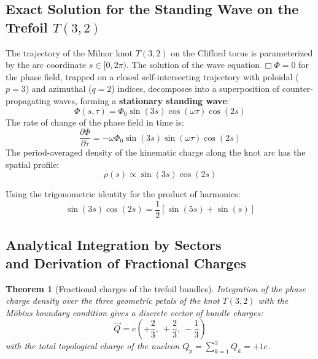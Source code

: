 \documentclass[12pt,a4paper]{article}
\newtheorem{theorem}{Theorem}
\begin{document}
		\subsection{Exact Solution for the Standing Wave on the Trefoil $T(3,2)$}
		The trajectory of the Milnor knot $T(3,2)$ on the Clifford torus is parameterized by the arc coordinate $s \in [0, 2\pi)$. 
		The solution of the wave equation $\Box \Phi = 0$ for the phase field, trapped on a closed self-intersecting trajectory with poloidal ($p=3$) and azimuthal ($q=2$) indices, decomposes into a superposition of counter-propagating waves, forming a \textbf{stationary standing wave}:
		\begin{equation}
			\Phi(s, \tau) = \Phi_0 \sin(3s) \cos(\omega \tau) \cos(2s)
		\end{equation}
		The rate of change of the phase field in time is:
		\begin{equation}
			\frac{\partial \Phi}{\partial \tau} = -\omega \Phi_0 \sin(3s) \sin(\omega \tau) \cos(2s)
		\end{equation}
		The period-averaged density of the kinematic charge along the knot arc has the spatial profile:
		\begin{equation}
			\rho(s) \propto \sin(3s) \cos(2s)
		\end{equation}
		
		Using the trigonometric identity for the product of harmonics:
		\begin{equation}
			\sin(3s) \cos(2s) = \frac{1}{2} \left[ \sin(5s) + \sin(s) \right]
		\end{equation}
		
		\subsection{Analytical Integration by Sectors\\ and Derivation of Fractional Charges}
		\begin{theorem}[Fractional charges of the trefoil bundles]
			Integration of the phase charge density over the three geometric petals of the knot $T(3,2)$ with the Möbius boundary condition gives a discrete vector of bundle charges:
			\begin{equation}
				\vec{Q} = e \left( +\frac{2}{3}, \ +\frac{2}{3}, \ -\frac{1}{3} \right)
			\end{equation}
			with the total topological charge of the nucleon $Q_p = \sum_{k=1}^3 Q_k = +1e$.
		\end{theorem}
		
\end{document}
